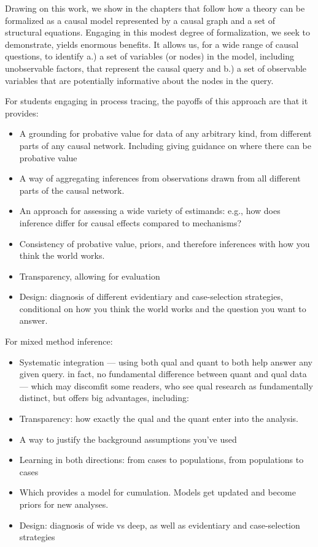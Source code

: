 \documentclass[12pt,]{book}
\begin{document}
Drawing on this work, we show in the chapters that follow how a theory can be formalized as a causal model represented by a causal graph and a set of structural equations. Engaging in this modest degree of formalization, we seek to demonstrate, yields enormous benefits. It allows us, for a wide range of causal questions, to identify a.) a set of variables (or nodes) in the model, including unobservable factors, that represent the causal query and b.) a set of observable variables that are potentially informative about the nodes in the query.

For students engaging in process tracing, the payoffs of this approach are that it provides:

\begin{itemize}
\item
  A grounding for probative value for data of any arbitrary kind, from different parts of any causal network. Including giving guidance on where there can be probative value
\item
  A way of aggregating inferences from observations drawn from all different parts of the causal network.
\item
  An approach for assessing a wide variety of estimands: e.g., how does inference differ for causal effects compared to mechanisms?
\item
  Consistency of probative value, priors, and therefore inferences with how you think the world works.
\item
  Transparency, allowing for evaluation
\item
  Design: diagnosis of different evidentiary and case-selection strategies, conditional on how you think the world works and the question you want to answer.
\end{itemize}

For mixed method inference:

\begin{itemize}
\item
  Systematic integration --- using both qual and quant to both help answer any given query. in fact, no fundamental difference between quant and qual data --- which may discomfit some readers, who see qual research as fundamentally distinct, but offers big advantages, including:
\item
  Transparency: how exactly the qual and the quant enter into the analysis.
\item
  A way to justify the background assumptions you've used
\item
  Learning in both directions: from cases to populations, from populations to cases
\item
  Which provides a model for cumulation. Models get updated and become priors for new analyses.
\item
  Design: diagnosis of wide vs deep, as well as evidentiary and case-selection strategies
\end{itemize}
\end{document}
